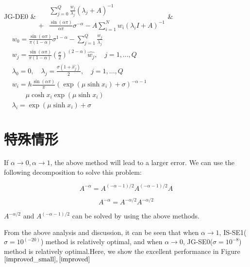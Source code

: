 \begin{table}[htbp]
\begin{tabular}
		\hline
		JG-DE0 &$\begin{aligned}&\sum_{j=0}^{Q}\frac{w_j}{\lambda_j}(\lambda_j+A)^{-1}\\+&\frac{\sin(\alpha \pi)}{\alpha\pi}\sigma^{-\alpha}-A\sum_{i=1}^{N} w_i(\lambda_i I+ A)^{-1}\end{aligned}$& $\begin{aligned}& w_0=\frac{\sin(\alpha \pi)}{\pi(1-\alpha)}\sigma^{1-\alpha}-\sum_{j=1}^{Q}\frac{w_j}{\lambda_j}\\& w_j=\frac{\sin(\alpha \pi)}{\pi(1-\alpha)}\left(\frac{\sigma}{2}\right)^{(2-\alpha)}\hat{w_j},\quad j=1,...,Q\\& \lambda_0=0,\quad \lambda_j=\frac{\sigma(1+\hat{x_j})}{2},\quad j=1,...,Q \\& w_i=h\frac{\sin(\alpha\pi)}{\pi}(\exp(\mu\sinh x_i)+\sigma)^{-\alpha-1}\\&\qquad \mu\cosh x_i\exp(\mu\sinh x_i)\\& \lambda_i=\exp(\mu\sinh x_i)+\sigma\end{aligned}$ \\
		
		\bottomrule
	\end{tabular}
\end{table}


\section{特殊情形}
If $\alpha \rightarrow 0,\alpha \rightarrow 1$, the above method will lead to a larger error. We can use the following decomposition to solve this problem:

\begin{equation}
{A}^{-\alpha}={A}^{(-\alpha-1)/2}{A}^{(-\alpha-1)/2}{A}
\label{special0}
\end{equation}

\begin{equation}
{A}^{-\alpha}={A}^{-\alpha/2}{A}^{-\alpha/2}
\label{special1}
\end{equation}

 ${A}^{-\alpha/2}$ and ${A}^{(-\alpha-1)/2}$  can be solved by using the above methods.

From the above analysis and discussion, it can be seen that when $\alpha \rightarrow 1$, IS-SE1($\sigma=10^({-20})$) method is relatively optimal, and when $\alpha \rightarrow 0$, JG-SE0($\sigma=10^{-8}$) method is relatively optimal.Here, we show the excellent performance in Figure $\ref{improved_small},\ref{improved}$

